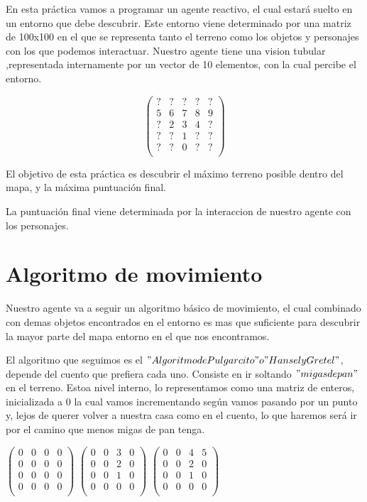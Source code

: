 \documentclass[10pt,a4paper,spanish]{article}
\begin{document}
En esta práctica vamos a programar un agente reactivo, el cual estará suelto en un entorno que debe descubrir.
Este entorno viene determinado por una matriz de 100x100 en el que se representa tanto el terreno como los objetos y personajes con los que podemos interactuar. Nuestro agente tiene una vision tubular ,representada internamente por un vector de 10 elementos, con la cual percibe el entorno.


\[
\begin{pmatrix}
? & ? & ? & ? & ?\\
5 & 6 & 7 & 8 & 9\\
? & 2 & 3 & 4 & ?\\
? & ? & 1 & ? & ?\\
? & ? & 0 & ? & ?\\
\end{pmatrix}
\]


El objetivo de esta práctica es descubrir el máximo terreno posible dentro del mapa, y la máxima puntuación final.

La puntuación final viene determinada por la interaccion de nuestro agente con los personajes.



\section{Algoritmo de movimiento}

Nuestro agente va a seguir un algoritmo básico de movimiento, el cual combinado con demas objetos encontrados en el entorno es mas que suficiente para descubrir la mayor parte del mapa entorno en el que nos encontramos.

El algoritmo que seguimos es el $"Algoritmo de Pulgarcito" o "Hansel y Gretel"$, depende del cuento que prefiera cada uno. Consiste en ir soltando $"migas de pan"$ en el terreno. Estoa nivel interno, lo representamos como una matriz de enteros, inicializada a 0 la cual vamos incrementando según vamos pasando por un punto y, lejos de querer volver a nuestra casa como en el cuento, lo que haremos será ir por el camino que menos migas de pan tenga.

$
\begin{pmatrix}
0 & 0 & 0 & 0 \\
0 & 0 & 0 & 0 \\
0 & 0 & 0 & 0 \\
0 & 0 & 0 & 0 \\
\end{pmatrix}
$
$
\begin{pmatrix}
0 & 0 & 3 & 0 \\
0 & 0 & 2 & 0 \\
0 & 0 & 1 & 0 \\
0 & 0 & 0 & 0 \\
\end{pmatrix}
$
$
\begin{pmatrix}
0 & 0 & 4 & 5 \\
0 & 0 & 2 & 0 \\
0 & 0 & 1 & 0 \\
0 & 0 & 0 & 0 \\
\end{pmatrix}
$
\end{document}
